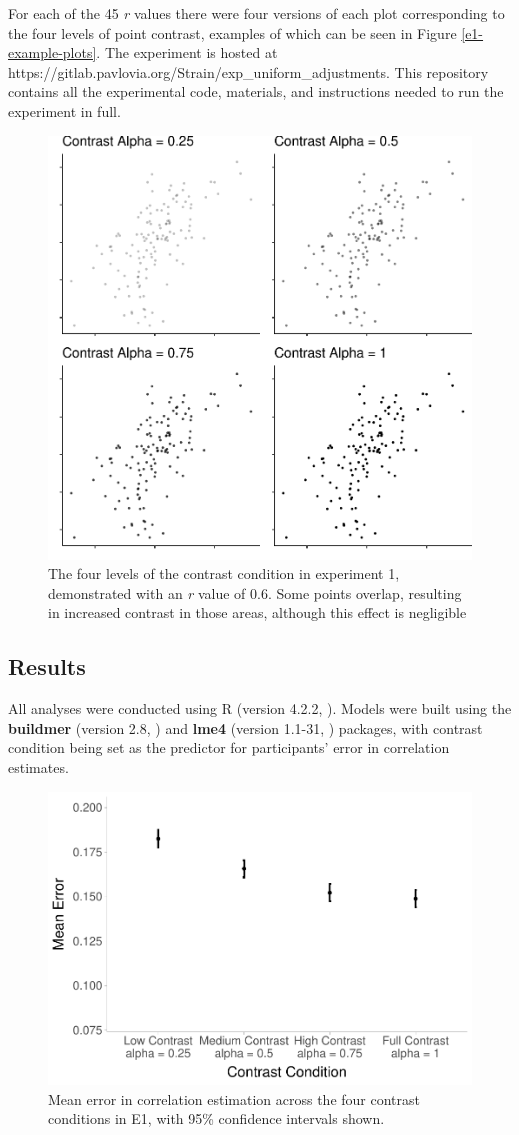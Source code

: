 \documentclass[preprint, 3p,
authoryear]{elsarticle} %
\begin{document}
For each of the 45 \emph{r} values there were four versions of each plot
corresponding to the four levels of point contrast, examples of which
can be seen in Figure \ref{e1-example-plots}. The experiment is hosted
at https://gitlab.pavlovia.org/Strain/exp\_uniform\_adjustments. This
repository contains all the experimental code, materials, and
instructions needed to run the experiment in full.

\begin{figure}

\includegraphics[width=0.5\linewidth]{contrast_and_scatterplots_files/figure-latex/e1-example-plots-1} \hfill{}

\caption{\label{e1-example-plots}The four levels of the contrast condition in experiment 1, demonstrated with an \textit{r} value of 0.6. Some points overlap, resulting in increased contrast in those areas, although this effect is negligible}\label{fig:e1-example-plots}
\end{figure}

\hypertarget{results}{%
\subsection{Results}\label{results}}

All analyses were conducted using R (version 4.2.2, \citealp{r_core}).
Models were built using the \textbf{buildmer} (version 2.8,
\citealp{voeten_buildmer_2022}) and \textbf{lme4} (version 1.1-31,
\citealp{bates_lme4_2015}) packages, with contrast condition being set
as the predictor for participants' error in correlation estimates.

\begin{figure}

\includegraphics[width=0.5\linewidth]{contrast_and_scatterplots_files/figure-latex/e1-dot-plot-1} \hfill{}

\caption{\label{e1-dot-plot}Mean error in correlation estimation across the four contrast conditions in E1, with 95\% confidence intervals shown.}\label{fig:e1-dot-plot}
\end{figure}
\end{document}
